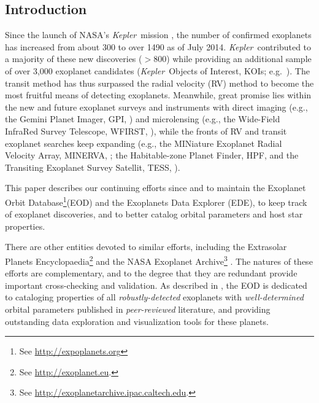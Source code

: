 \documentclass[11pt,preprint]{aastex}
\def\kepler{\textit{Kepler}}
\begin{document}
\begin{CJK*}{UTF8}{gbsn}
\section{Introduction}\label{sec:intro}

Since the launch of NASA's \kepler\ mission \citep{Borucki2010}, the
number of confirmed exoplanets has increased from about 300 to over
1490 as of July 2014. \kepler\ contributed to a majority of these new
discoveries ($> 800$) while providing an additional sample of over
3,000 exoplanet candidates (\kepler\ Objects of Interest, KOIs;
e.g.~\citealt{Batalha2013}). The transit method has thus surpassed the
radial velocity (RV) method to become the most fruitful means of
detecting exoplanets. Meanwhile, great promise lies within the new and
future exoplanet surveys and instruments with direct imaging (e.g.,
the Gemini Planet Imager, GPI, \citealt{Macintosh2014}) and
microlensing (e.g., the Wide-Field InfraRed Survey Telescope, WFIRST,
\citealt{Green2012}), while the fronts of RV and transit exoplanet
searches keep expanding (e.g., the MINiature Exoplanet Radial Velocity
Array, MINERVA, \citealt{Wright2014}; the Habitable-zone Planet Finder,
HPF, \citealt{Mahadevan2012} and the Transiting Exoplanet Survey
Satellit, TESS, \citealt{Ricker2014}).

This paper describes our continuing efforts since \cite{Butler2006}
and \cite{Wright2011} to maintain the Exoplanet Orbit Database\footnote{See \url{http://expoplanets.org}}(EOD)
and the Exoplanets Data Explorer (EDE), to keep track of exoplanet
discoveries, and to better catalog orbital parameters and host star
properties. 

There are other entities devoted to similar efforts,
including the Extrasolar Planets Encyclopaedia\footnote{See
  \url{http://exoplanet.eu}.}  \citep{Schneider2011} and the NASA
Exoplanet Archive\footnote{See
  \url{http://exoplanetarchive.ipac.caltech.edu}.}
\citep{Akeson2013}.  The natures of these efforts are complementary, and to the
degree that they are redundant provide important cross-checking and
validation.  As described in \cite{Wright2011}, the EOD is
dedicated to cataloging properties of all \emph{robustly-detected} exoplanets with
\emph{well-determined} orbital parameters published in
\emph{peer-reviewed} literature, and providing outstanding data
exploration and visualization tools for these planets.


\end{CJK*}
\end{document}
